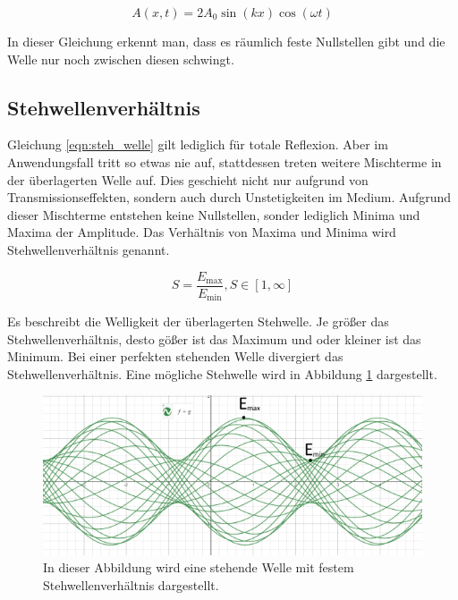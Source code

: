\begin{equation}
              \label{eqn:steh_welle}
              A(x,t) = 2A_0\sin(kx)\cos(\omega t)
\end{equation}

In dieser Gleichung erkennt man, dass es räumlich feste Nullstellen gibt und die Welle nur noch zwischen diesen schwingt.

\subsection{Stehwellenverhältnis}
\label{subsec:Stehwellenverhaeltnis}
Gleichung \ref{eqn:steh_welle} gilt lediglich für totale Reflexion. Aber im Anwendungsfall tritt so etwas nie auf, stattdessen treten weitere Mischterme in der überlagerten Welle auf.
Dies geschieht nicht nur aufgrund von Transmissionseffekten, sondern auch durch Unstetigkeiten im Medium. Aufgrund dieser Mischterme entstehen keine Nullstellen, sonder
lediglich Minima und Maxima der Amplitude. Das Verhältnis von Maxima und Minima wird Stehwellenverhältnis genannt.

\begin{equation}
              \label{eqn:SWR}
              S = \frac{E_\mathrm{max}}{E_\mathrm{min}}, S\in[1,\infty]
\end{equation}

Es beschreibt die Welligkeit der überlagerten Stehwelle. Je größer
das Stehwellenverhältnis, desto gößer ist das Maximum und oder kleiner ist das Minimum. Bei einer perfekten stehenden Welle divergiert das Stehwellenverhältnis. Eine mögliche
Stehwelle wird in Abbildung \ref{fig:stehwelle} dargestellt.

\begin{figure}
              \centering
              \includegraphics[width = .9\textwidth]{content/stehwelle.PNG}
              \caption{In dieser Abbildung wird eine stehende Welle mit festem Stehwellenverhältnis dargestellt.}
              \label{fig:stehwelle}
\end{figure}

